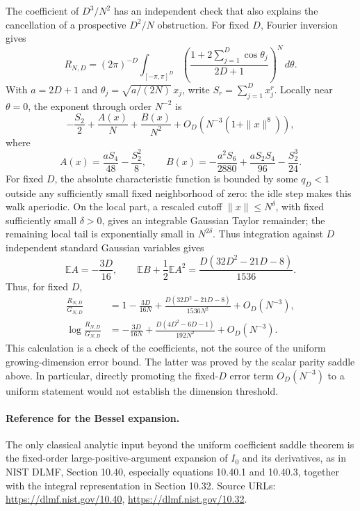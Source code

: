 \documentclass[11pt,letterpaper]{article}
\theoremstyle{remark}\newtheorem{remark}[theorem]{Remark}
\begin{document}
The coefficient of $D^3/N^2$ has an independent check that also
explains the cancellation of a prospective $D^2/N$ obstruction.
For fixed $D$, Fourier inversion gives
\[
 R_{N,D}=(2\pi)^{-D}\int_{[-\pi,\pi]^D}
 \left(\frac{1+2\sum_{j=1}^D\cos\theta_j}{2D+1}\right)^N
 \,d\theta.
\]
With $a=2D+1$ and $\theta_j=\sqrt{a/(2N)}\,x_j$, write
$S_r=\sum_{j=1}^D x_j^r$. Locally near $\theta=0$, the exponent through order $N^{-2}$ is
\[
 -\frac{S_2}{2}+\frac{A(x)}N+\frac{B(x)}{N^2}+O_D(N^{-3}
 (1+\|x\|^8)),
\]
where
\[
 A(x)=\frac{aS_4}{48}-\frac{S_2^2}{8},\qquad
 B(x)=-\frac{a^2S_6}{2880}+
       \frac{aS_2S_4}{96}-\frac{S_2^3}{24}.
\]
For fixed $D$, the absolute characteristic function is bounded by
some $q_D<1$ outside any sufficiently small fixed neighborhood of
zero: the idle step makes this walk aperiodic. On the local part,
a rescaled cutoff $\|x\|\le N^\delta$, with fixed sufficiently small
$\delta>0$, gives an integrable Gaussian Taylor remainder; the
remaining local tail is exponentially small in $N^{2\delta}$.
Thus integration against $D$ independent standard Gaussian variables
gives
\[
 \mathbb E A=-\frac{3D}{16},
 \qquad
 \mathbb E B+\frac12\mathbb E A^2
   =\frac{D(32D^2-21D-8)}{1536}.
\]
Thus, for fixed $D$,
\begin{align*}
 \frac{R_{N,D}}{G_{N,D}}
 &=1-\frac{3D}{16N}
   +\frac{D(32D^2-21D-8)}{1536N^2}+O_D(N^{-3}),\\
 \log\frac{R_{N,D}}{G_{N,D}}
 &=-\frac{3D}{16N}
   +\frac{D(4D^2-6D-1)}{192N^2}+O_D(N^{-3}).
\end{align*}
This calculation is a check of the coefficients, not the source of
the uniform growing-dimension error bound. The latter was proved
by the scalar parity saddle above. In particular, directly promoting
the fixed-$D$ error term $O_D(N^{-3})$ to a uniform statement would
not establish the dimension threshold.

\paragraph{Reference for the Bessel expansion.}
The only classical analytic input beyond the uniform coefficient
saddle theorem is the fixed-order large-positive-argument expansion
of $I_0$ and its derivatives, as in NIST DLMF, Section 10.40,
especially equations 10.40.1 and 10.40.3, together with the integral
representation in Section 10.32. Source URLs:
\url{https://dlmf.nist.gov/10.40},
\url{https://dlmf.nist.gov/10.32}.
\end{document}
